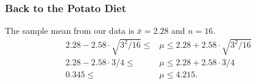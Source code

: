 \documentclass{beamer}
\begin{document}
\begin{frame}
\frametitle{Back to the Potato Diet}

The sample mean from our data is $\bar{x} = 2.28$ and $n = 16$.
\begin{align*}
2.28 - 2.58 \cdot \sqrt{3^2 / 16} \leq &\mu \leq 2.28 + 2.58 \cdot \sqrt{3^2 / 16} \\
2.28 - 2.58 \cdot 3/4 \leq &\mu \leq 2.28 + 2.58 \cdot 3/4 \\
0.345 \leq &\mu \leq 4.215.
\end{align*}

\end{frame}
\end{document}
